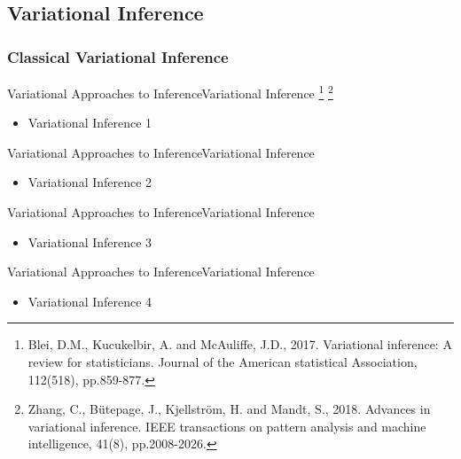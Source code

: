 \documentclass[AERbeamer%
              ,optEnglish%
              ,optBiber%
              ,optBibstyleAlphabetic%
              ,optBeamerClassicFormat%
              ]{AERlatex}%
\begin{document}
\subsection{Variational Inference}

\subsubsection*{Classical Variational Inference}
\begin{frame}[c]{Variational Approaches to Inference}{Variational Inference \footnote{Blei, D.M., Kucukelbir, A. and McAuliffe, J.D., 2017. Variational inference: A
                                                                                      review for statisticians. Journal of the American statistical Association, 112(518),
                                                                                      pp.859-877.}
                                                                            \footnote{Zhang, C., Bütepage, J., Kjellström, H. and Mandt, S., 2018. Advances in variational inference.
                                                                                      IEEE transactions on pattern analysis and machine intelligence, 41(8), pp.2008-2026.}}
    \centering
    \begin{itemize}
        \item Variational Inference 1
    \end{itemize}
\end{frame}


\begin{frame}[c]{Variational Approaches to Inference}{Variational Inference}
    \centering
    \begin{itemize}
        \item Variational Inference 2
    \end{itemize}
\end{frame}


\begin{frame}[c]{Variational Approaches to Inference}{Variational Inference}
    \centering
    \begin{itemize}
        \item Variational Inference 3
    \end{itemize}
\end{frame}


\begin{frame}[c]{Variational Approaches to Inference}{Variational Inference}
    \centering
    \begin{itemize}
        \item Variational Inference 4
    \end{itemize}
\end{frame}
\end{document}
